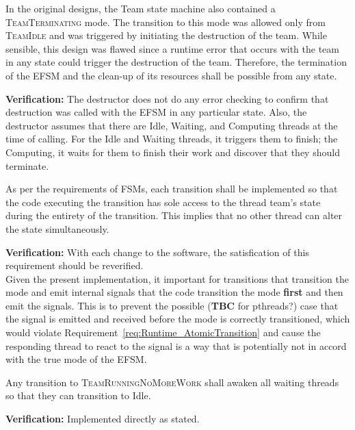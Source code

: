 \documentclass{article}
\newcommand{\TeamIdle}          {\textsc{TeamIdle}}
\newcommand{\TeamRunningNoMoreWork} {\textsc{TeamRunningNoMoreWork}}
\newcommand{\TeamTerminating}   {\textsc{TeamTerminating}}
\begin{document}
\begin{req}
In the original designs, the Team state machine also contained a
{\TeamTerminating} mode.  The transition to this mode was allowed only from
{\TeamIdle} and was triggered by initiating the destruction of the team.  While
sensible, this design was flawed since a runtime error that occurs with the team
in any state could trigger the destruction of the team.  Therefore, the
termination of the EFSM and the clean-up of its resources shall be possible from
any state.
\end{req}
\textbf{Verification:}\hspace{0.125in}  The destructor does not do any error
checking to confirm that destruction was called with the EFSM in any particular
state.  Also, the destructor assumes that there are Idle, Waiting, and Computing
threads at the time of calling.  For the Idle and Waiting threads, it triggers
them to finish; the Computing, it waits for them to finish their work and
discover that they should terminate.

\begin{req}
\label{req:Runtime_AtomicTransition}
As per the requirements of FSMs, each transition shall be implemented so that
the code executing the transition has sole access to the thread team's state
during the entirety of the transition.  This implies that no other thread can
alter the state simultaneously.
\end{req}
\textbf{Verification:}\hspace{0.125in}  With each change to the software, the
satisfication of this requirement should be reverified.\\

Given the present implementation, it important for transitions that transition
the mode and emit internal signals that the code transition the mode
\textbf{first} and then emit the signals.  This is to prevent the possible
(\textbf{TBC} for pthreads?) case that the signal is emitted and received
before the mode is correctly transitioned, which would violate
Requirement~\ref{req:Runtime_AtomicTransition} and cause the responding thread
to react to the signal is a way that is potentially not in accord with the true
mode of the EFSM.

\begin{req}
Any transition to {\TeamRunningNoMoreWork} shall awaken all waiting threads so
that they can transition to Idle.
\end{req}
\textbf{Verification:}\hspace{0.125in}  Implemented directly as stated.
\end{document}
